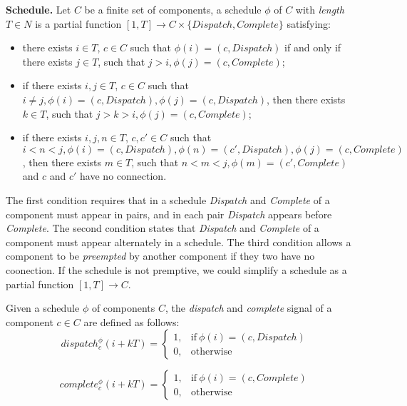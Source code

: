 {\bf Schedule.}
Let $C$ be a finite set of components, a schedule $\phi$ of $C$ with \emph{length} $T\in N$ is a partial function $[1, T] \rightarrow C\times \{Dispatch, Complete\}$ satisfying:
\begin{itemize}
	\item there exists $i\in T$, $c\in C$ such that $\phi(i) = (c, Dispatch)$ if and only if there exists $j\in T$, such that $j > i, \phi(j) =  (c, Complete)$;
	\item if there exists $i, j\in T$, $c\in C$ such that $i \neq j, \phi(i) = (c, Dispatch), \phi(j) = (c, Dispatch)$, then there exists $k\in T$, such that $j >k> i, \phi(j) =  (c, Complete)$;
	\item if there exists $i, j, n\in T$, $c, c'\in C$ such that $i < n < j, \phi(i) = (c, Dispatch), \phi(n) = (c', Dispatch), \phi(j) = (c, Complete)$, then there exists $m\in T$, such that $n < m < j, \phi(m) =  (c', Complete)$ and $c$ and $c'$ have no connection.
\end{itemize}
The first condition requires that in a schedule \emph{Dispatch} and \emph{Complete} of a component must appear in pairs, and in each pair \emph{Dispatch} appears before \emph{Complete}. 
The second condition states that \emph{Dispatch} and \emph{Complete} of a component must appear alternately in a schedule. 
The third condition allows a component to be \emph{preempted} by another component if they two have no coonection.
If the schedule is not premptive, we could simplify a schedule as a partial function $[1, T] \rightarrow C$.

Given a schedule $\phi$ of components $C$, the \emph{dispatch} and \emph{complete} signal of a component $c \in C$ are defined as follows: 
\begin{equation}
\label{eqn:dispatch}
    dispatch_c^\phi(i+kT) =
    \begin{cases}
      1, & \text{if}\ \phi(i) = (c, Dispatch) \\
      0, & \text{otherwise}
    \end{cases}
\end{equation}

\begin{equation}
\label{eqn:complete}
    complete_c^\phi(i+kT) =
    \begin{cases}
      1, & \text{if}\ \phi(i) = (c, Complete) \\
      0, & \text{otherwise}
    \end{cases}
\end{equation}


